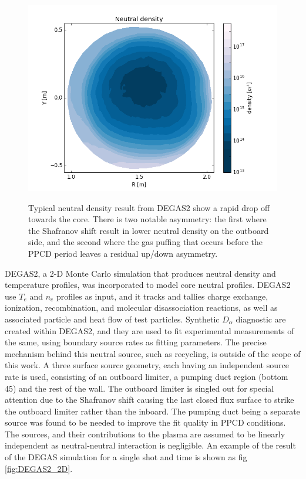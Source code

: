 \documentclass[aip, pop, preprint]{revtex4-1}
\begin{document}
\begin{figure}
	\centering
	\includegraphics[width = 1.\linewidth]{./plots/degas_neutral_n}
	\label{fig:DEGAS2_2d_density}
	\caption{Typical neutral density result from DEGAS2 show a rapid drop off towards the core. There is two notable asymmetry: the first where the Shafranov shift result in lower neutral density on the outboard side, and the second where the gas puffing that occurs before the PPCD period leaves a residual up/down asymmetry.}
\end{figure}%

DEGAS2, a 2-D Monte Carlo simulation that produces  neutral density and
temperature profiles, was incorporated to model core neutral profiles. DEGAS2
use  $ T_{e} $ and $ n_{e} $ profiles as input, and it tracks and tallies
charge exchange, ionization, recombination, and molecular disassociation
reactions, as well as associated particle and heat flow of test particles.
Synthetic $ D_{\alpha} $ diagnostic are created within DEGAS2, and they are
used to fit experimental measurements of the same, using boundary source rates
as fitting parameters. The precise mechanism behind this neutral source, such
as recycling, is outside of the scope of this work. A three surface source
geometry, each having an independent source rate is used, consisting of an
outboard limiter, a pumping duct region (bottom 45\textdegree) and the rest of
the wall. The outboard limiter is singled out for special attention due to the
Shafranov shift causing the last closed flux surface to strike the outboard
limiter rather than the inboard. The pumping duct being a separate source was
found to be needed to improve the fit quality in PPCD conditions. The sources,
and their contributions to the plasma are assumed to be linearly independent as
neutral-neutral interaction is negligible. An example of the result of the
DEGAS simulation for a single shot and time is shown as fig
\ref{fig:DEGAS2_2D}.
\end{document}
